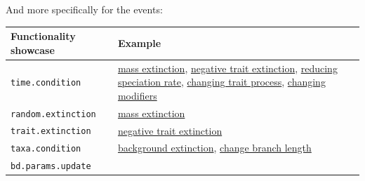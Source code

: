 \documentclass[
]{book}
\begin{document}
And more specifically for the events:

\begin{longtable}[]{@{}ll@{}}
\toprule
\begin{minipage}[b]{0.55\columnwidth}\raggedright
Functionality showcase\strut
\end{minipage} & \begin{minipage}[b]{0.39\columnwidth}\raggedright
Example\strut
\end{minipage}\tabularnewline
\midrule
\endhead
\begin{minipage}[t]{0.55\columnwidth}\raggedright
\texttt{time.condition}\strut
\end{minipage} & \begin{minipage}[t]{0.39\columnwidth}\raggedright
\protect\hyperlink{EGrandom_ext}{mass extinction}, \protect\hyperlink{EGneg_ext}{negative trait extinction}, \protect\hyperlink{EGred_spec}{reducing speciation rate}, \protect\hyperlink{EG_change_trait}{changing trait process}, \protect\hyperlink{EG_change_modif}{changing modifiers}\strut
\end{minipage}\tabularnewline
\begin{minipage}[t]{0.55\columnwidth}\raggedright
\texttt{random.extinction}\strut
\end{minipage} & \begin{minipage}[t]{0.39\columnwidth}\raggedright
\protect\hyperlink{EGrandom_ext}{mass extinction}\strut
\end{minipage}\tabularnewline
\begin{minipage}[t]{0.55\columnwidth}\raggedright
\texttt{trait.extinction}\strut
\end{minipage} & \begin{minipage}[t]{0.39\columnwidth}\raggedright
\protect\hyperlink{EGneg_ext}{negative trait extinction}\strut
\end{minipage}\tabularnewline
\begin{minipage}[t]{0.55\columnwidth}\raggedright
\texttt{taxa.condition}\strut
\end{minipage} & \begin{minipage}[t]{0.39\columnwidth}\raggedright
\protect\hyperlink{EGbg_ext}{background extinction}, \protect\hyperlink{EG_modify_brlen}{change branch length}\strut
\end{minipage}\tabularnewline
\begin{minipage}[t]{0.55\columnwidth}\raggedright
\texttt{bd.params.update}\strut
\end{minipage} & \begin{minipage}[t]{0.39\columnwidth}\raggedright

\end{minipage}
\end{longtable}
\end{document}
